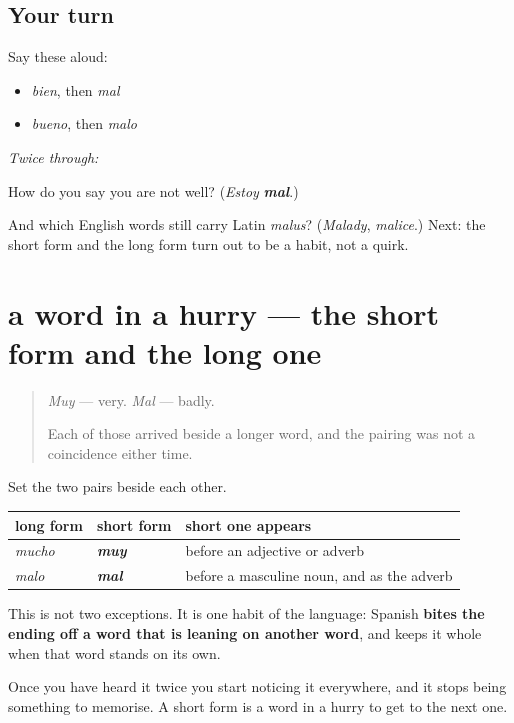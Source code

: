 \subsection*{Your turn}
Say these aloud:

\begin{itemize}
\raggedright
  \item \emph{bien}, then \emph{mal}
  \item \emph{bueno}, then \emph{malo}
\end{itemize}

\emph{Twice through:}

\begin{tcolorbox}[breakable,colback=teal!4,colframe=teal!35!black,title={Before you move on}]
How do you say you are not well? (\emph{Estoy} \emph{\textbf{mal}}.)

And which English words still carry Latin \emph{malus}? (\emph{Malady}, \emph{malice}.) Next: the short form and the long form turn out to be a habit, not a quirk.
\end{tcolorbox}
\section[mucho · muy, malo · mal]{a word in a hurry — the short form and the long one}

\label{lesson:ES-C60-apocope}



\begin{quote}
\emph{Muy} — very. \emph{Mal} — badly.

Each of those arrived beside a longer word, and the pairing was not a coincidence either time.
\end{quote}

\begin{culture}
Set the two pairs beside each other.

\noindent
\begin{tabularx}{\linewidth}{@{}>{\raggedright\arraybackslash}X>{\raggedright\arraybackslash}X>{\raggedright\arraybackslash}X@{}}
\toprule
\textbf{long form} & \textbf{short form} & \textbf{short one appears} \\
\midrule
\emph{mucho} & \emph{\textbf{muy}} & before an adjective or adverb \\
\emph{malo} & \emph{\textbf{mal}} & before a masculine noun, and as the adverb \\
\bottomrule
\end{tabularx}

This is not two exceptions. It is one habit of the language: Spanish \textbf{bites the ending off a word that is leaning on another word}, and keeps it whole when that word stands on its own.

Once you have heard it twice you start noticing it everywhere, and it stops being something to memorise. A short form is a word in a hurry to get to the next one.
\end{culture}

